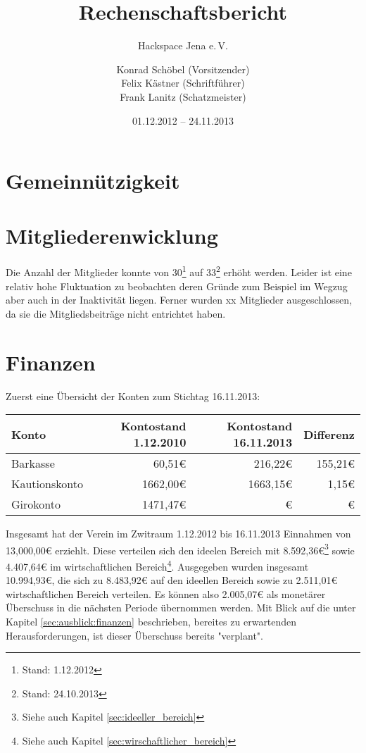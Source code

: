 \documentclass[10pt,DIV16]{scrartcl}
\title{Rechenschaftsbericht}
\subtitle{Hackspace Jena e.\,V.}
\author{%
	Konrad Schöbel (Vorsitzender)\\
    Felix Kästner (Schriftführer)\\
	Frank Lanitz (Schatzmeister)
}
\date{01.12.2012 -- 24.11.2013}
\begin{document}
\maketitle{}

\tableofcontents{}

\newpage{}

\section{Gemeinnützigkeit}

\section{Mitgliederenwicklung}

Die Anzahl der Mitglieder konnte von 30\footnote{Stand: 1.12.2012} auf
33\footnote{Stand: 24.10.2013} erhöht werden. Leider ist eine relativ
hohe Fluktuation zu beobachten deren Gründe zum Beispiel im Wegzug aber
auch in der Inaktivität liegen. Ferner wurden xx Mitglieder
ausgeschlossen, da sie die Mitgliedsbeiträge nicht entrichtet haben.

\section{Finanzen}

Zuerst eine Übersicht der Konten zum Stichtag 16.11.2013:

\begin{table}[h]
\begin{tabular}{l|r|r|r}
\textbf{Konto} & \textbf{Kontostand 1.12.2010} & \textbf{Kontostand 16.11.2013} & \textbf{Differenz} \\ \hline
Barkasse & 60,51\euro & 216,22\euro & 155,21\euro \\
Kautionskonto & 1662,00\euro & 1663,15\euro & 1,15\euro \\
Girokonto & 1471,47\euro & \euro & \euro \\ \hline
\end{tabular}
\end{table}

Insgesamt hat der Verein im Zwitraum 1.12.2012 bis 16.11.2013 Einnahmen 
von 13,000,00\euro{} erziehlt. Diese verteilen sich den ideelen Bereich 
mit 8.592,36\euro\footnote{Siehe auch Kapitel 
\ref{sec:ideeller_bereich}} sowie 4.407,64\euro{} im wirtschaftlichen 
Bereich\footnote{Siehe auch Kapitel \ref{sec:wirschaftlicher_bereich}}. 
Ausgegeben wurden insgesamt 10.994,93\euro, die sich zu 8.483,92\euro{} 
auf den ideellen Bereich sowie zu 2.511,01\euro{} wirtschaftlichen 
Bereich verteilen. Es können also 2.005,07\euro{} als monetärer 
Überschuss in die nächsten Periode übernommen werden. Mit Blick auf die 
unter Kapitel \ref{sec:ausblick:finanzen} beschrieben, bereites zu 
erwartenden Herausforderungen, ist dieser Überschuss bereits 
"verplant".
\end{document}

